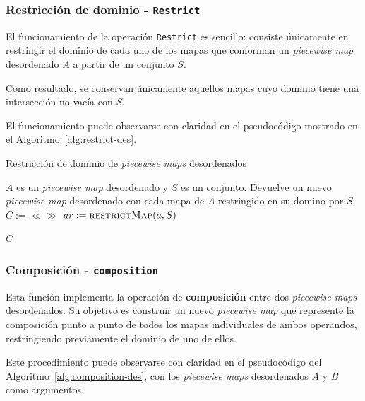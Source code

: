 \newpage
\subsubsection{Restricción de dominio - \texttt{Restrict}}

El funcionamiento de la operación \texttt{Restrict} es sencillo: consiste únicamente en restringir el dominio de cada uno de los mapas que conforman un \textit{piecewise map} desordenado $A$ a partir de un conjunto $S$. 

Como resultado, se conservan únicamente aquellos mapas cuyo dominio tiene una intersección no vacía con $S$.

El funcionamiento puede observarse con claridad en el pseudocódigo mostrado en el Algoritmo~\ref{alg:restrict-des}.


\begin{algorithm}
\caption{Restricción de dominio de \textit{piecewise maps} desordenados}
\label{alg:restrict-des}
\begin{algorithmic}[1]
\Require $A$ es un \textit{piecewise map} desordenado y $S$ es un conjunto.
\Ensure Devuelve un nuevo \textit{piecewise map} desordenado con cada mapa de $A$ restringido en su domino por $S$.
    \State $C := \ll\gg$
    \State $ar := \Call{restrictMap}{a, S}$ 
    \State {}
  \EndFor

  \State \Return $C$
\EndFunction
\end{algorithmic}
\end{algorithm}

\subsubsection{Composición - \texttt{composition}}


Esta función implementa la operación de \textbf{composición} entre dos \textit{piecewise maps} desordenados. Su objetivo es construir un nuevo \textit{piecewise map} que represente la composición punto a punto de todos los mapas individuales de ambos operandos, restringiendo previamente el dominio de uno de ellos.

Este procedimiento puede observarse con claridad en el pseudocódigo del Algoritmo~\ref{alg:composition-des}, con los \textit{piecewise maps} desordenados $A$ y $B$ como argumentos.



